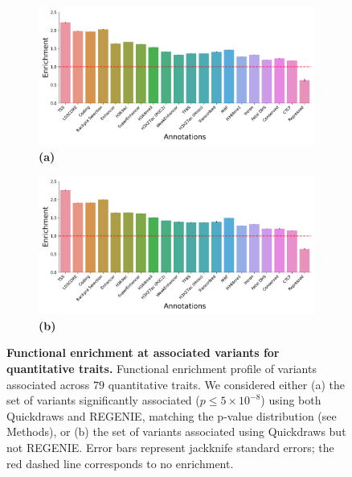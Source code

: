 \begin{figure}[h!]
    \centering
    \begin{subfigure}{0.5\textwidth}
    \captionsetup{justification=raggedright,singlelinecheck=false}
    \caption*{\textbf{(a)}}
    \includegraphics[width=\textwidth]{figures/functional/annotation_both_quant.pdf}
    \end{subfigure}%
    \begin{subfigure}{0.5\textwidth}
    \captionsetup{justification=raggedright,singlelinecheck=false}
    \caption*{\textbf{(b)}}
    \includegraphics[width=\textwidth]{figures/functional/annotation_onlyqd_quant.pdf}
    \end{subfigure}
    \caption{\textbf{Functional enrichment at associated variants for quantitative traits.}
    Functional enrichment profile of variants associated across $79$ quantitative traits.
    We considered either (a) the set of variants significantly associated ($p \leq 5 \times 10^{-8}$) using both Quickdraws and REGENIE, matching the p-value distribution (see Methods), or (b) the set of variants associated using Quickdraws but not REGENIE.
    Error bars represent jackknife standard errors; the red dashed line corresponds to no enrichment.
    }
    \label{fig:functional_qt}
\end{figure}

